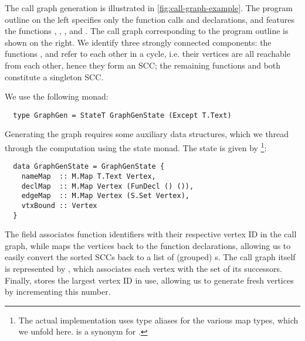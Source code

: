 The call graph generation is illustrated in \cref{fig:call-graph-example}. The
program outline on the left specifies only the function calls and declarations,
and features the functions , , ,  and
.
The call graph corresponding to the program outline is shown on the right.
We identify three strongly connected components: the functions ,
 and  refer to each other in a cycle, i.e. their vertices are
all reachable from each other, hence they form an SCC; the remaining functions
 and  both constitute a singleton SCC.

We use the following monad:
\begin{verbatim}
  type GraphGen = StateT GraphGenState (Except T.Text)
\end{verbatim}
%
Generating the graph requires some auxiliary data structures, which we thread
through the computation using the state monad. The state is given by
\footnote{The actual implementation uses type aliases for
the various map types, which we unfold here.
 is a synonym for .}:
\begin{verbatim}
  data GraphGenState = GraphGenState {
    nameMap  :: M.Map T.Text Vertex,
    declMap  :: M.Map Vertex (FunDecl () ()),
    edgeMap  :: M.Map Vertex (S.Set Vertex),
    vtxBound :: Vertex
  }
\end{verbatim}
%
The  field associates function identifiers with their respective
vertex ID in the call graph, while  maps the vertices back to the
function declarations, allowing us to easily convert the sorted SCCs back to a
list of (grouped) s.
The call graph itself is represented by , which associates each
vertex with the set of its successors. Finally,  stores the
largest vertex ID in use, allowing us to generate fresh vertices by incrementing
this number.


